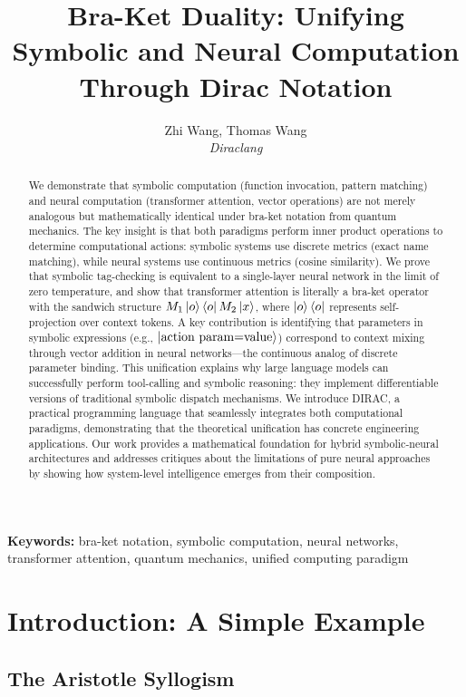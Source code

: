 \documentclass[11pt,a4paper]{article}
\title{\textbf{Bra-Ket Duality: Unifying Symbolic and Neural Computation Through Dirac Notation}}
\author{
Zhi Wang, Thomas Wang\\
\textit{Diraclang}\\
}
\date{}
\theoremstyle{definition}
\begin{document}
\maketitle

\begin{abstract}
We demonstrate that symbolic computation (function invocation, pattern matching) and neural computation (transformer attention, vector operations) are not merely analogous but mathematically identical under bra-ket notation from quantum mechanics. The key insight is that both paradigms perform inner product operations to determine computational actions: symbolic systems use discrete metrics (exact name matching), while neural systems use continuous metrics (cosine similarity). We prove that symbolic tag-checking is equivalent to a single-layer neural network in the limit of zero temperature, and show that transformer attention is literally a bra-ket operator with the sandwich structure $M_1 \ket{o}\bra{o} M_2 \ket{x}$, where $\ket{o}\bra{o}$ represents self-projection over context tokens. A key contribution is identifying that parameters in symbolic expressions (e.g., $\ket{\text{action param=value}}$) correspond to context mixing through vector addition in neural networks---the continuous analog of discrete parameter binding. This unification explains why large language models can successfully perform tool-calling and symbolic reasoning: they implement differentiable versions of traditional symbolic dispatch mechanisms. We introduce DIRAC, a practical programming language that seamlessly integrates both computational paradigms, demonstrating that the theoretical unification has concrete engineering applications. Our work provides a mathematical foundation for hybrid symbolic-neural architectures and addresses critiques about the limitations of pure neural approaches by showing how system-level intelligence emerges from their composition.
\end{abstract}

\textbf{Keywords:} bra-ket notation, symbolic computation, neural networks, transformer attention, quantum mechanics, unified computing paradigm

\section{Introduction: A Simple Example}

\subsection{The Aristotle Syllogism}
\end{document}
